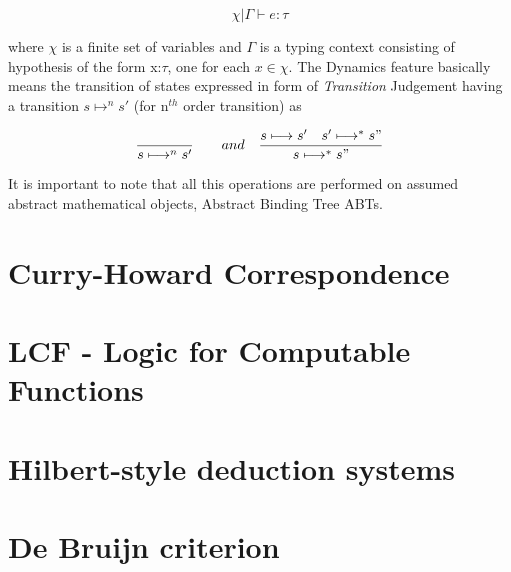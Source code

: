 \[\chi | \Gamma\vdash e:\tau\]

where $\chi$ is a finite set of variables and $\Gamma$ is a typing context consisting of hypothesis of the form x:$\tau$, one for each $x\in\chi$. The Dynamics feature basically means the transition of states expressed in form of \textit{Transition} Judgement having a transition $s\longmapsto^n s'$ (for n$^{th}$ order transition) as

\[\dfrac{}{s\longmapsto^n s'} \quad \quad and \quad \dfrac{{s\longmapsto s'} \quad {s'\longmapsto^{*} s"}}{s\longmapsto^{*} s"}  \]

It is important to note that all this operations are performed on assumed abstract mathematical objects, Abstract Binding Tree ABTs. 

\section{Curry-Howard Correspondence}
\lipsum[1] \lipsum[1]
\section{LCF - Logic for Computable Functions}
\lipsum[1] \lipsum[1]
\section{Hilbert-style deduction systems}
\lipsum[1] \lipsum[1]
\section{De Bruijn criterion}
\lipsum[1] \lipsum[1]
